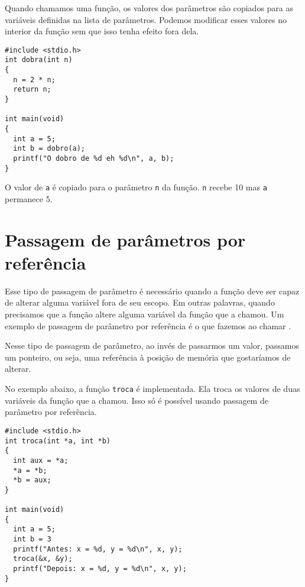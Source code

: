 Quando chamamos uma função, os valores dos parâmetros são copiados para as variáveis definidas na lista de parâmetros. Podemos modificar esses valores no interior da função sem que isso tenha efeito fora dela.

\begin{lstlisting}
#include <stdio.h>
int dobra(int n)
{
  n = 2 * n;
  return n;
}

int main(void)
{
  int a = 5;
  int b = dobro(a);
  printf("O dobro de %d eh %d\n", a, b);
}
\end{lstlisting}

O valor de {\tt a} é copiado para o parâmetro {\tt n} da função. {\tt n} recebe 10 mas {\tt a} permanece 5.


\section{Passagem de parâmetros por referência}

Esse tipo de passagem de parâmetro é necessário quando a função deve ser capaz de alterar alguma variável fora de seu escopo. Em outras palavras, quando precisamos que a função altere alguma variável da função que a chamou. Um exemplo de passagem de parâmetro por referência é o que fazemos ao chamar \SCANF.

Nesse tipo de passagem de parâmetro, ao invés de passarmos um valor, passamos um ponteiro, ou seja, uma referência à posição de memória que gostaríamos de alterar.

No exemplo abaixo, a função {\tt troca} é implementada. Ela troca os valores de duas variáveis da função que a chamou. Isso só é possível usando passagem de parâmetro por referência.

\begin{lstlisting}
#include <stdio.h>
int troca(int *a, int *b)
{
  int aux = *a;
  *a = *b;
  *b = aux;
}

int main(void)
{
  int a = 5;
  int b = 3
  printf("Antes: x = %d, y = %d\n", x, y);
  troca(&x, &y);
  printf("Depois: x = %d, y = %d\n", x, y);
}
\end{lstlisting}


